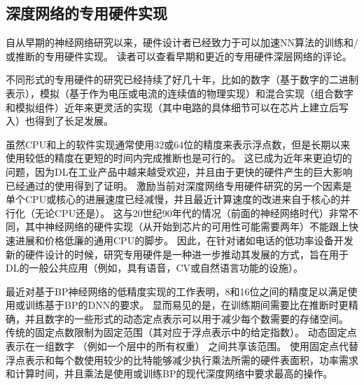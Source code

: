 \subsection{深度网络的专用硬件实现}
\label{sec:specialized_hardware_implementations_of_deep_networks}

自从早期的神经网络研究以来，硬件设计者已经致力于可以加速\gls{NN}算法的训练和/或推断的专用硬件实现。
读者可以查看早期和更近的专用硬件深层网络的评论\citep{Lindsey+Lindblad-1994,Beiu-et-al-2003,Misra+Saha-2010}。


不同形式的专用硬件\citep{Graf+Jackel-1989,Mead+Ismail-2012,Kim-et-al-2009,Pham-et-al-2012,Chen-et-al-IEEE2014,Chen-et-al-ACM2014}的研究已经持续了好几十年，比如的数字（基于数字的二进制表示），模拟\citep{Graf+Jackel-1989,Mead+Ismail-2012}（基于作为电压或电流的连续值的物理实现）和混合实现（组合数字和模拟组件）近年来更灵活的实现（其中电路的具体细节可以在芯片上建立后写入）也得到了长足发展。



虽然CPU和上的软件实现通常使用32或64位的精度来表示浮点数，但是长期以来使用较低的精度在更短的时间内完成推断也是可行的\citep{Holt-et-al-1991,Holi+Hwang-1993,Presley-et-al-1994,Simard+Graf-NIPS1994,Wawrzynek-et-al-IEEE1996,Savich-et-al-2007}。
这已成为近年来更迫切的问题，因为\gls{DL}在工业产品中越来越受欢迎，并且由于更快的硬件产生的巨大影响已经通过的使用得到了证明。
激励当前对深度网络专用硬件研究的另一个因素是单个CPU或核心的进展速度已经减慢，并且最近计算速度的改进来自于核心的并行化（无论CPU还是）。
这与20世纪90年代的情况（前面的神经网络时代）非常不同，其中神经网络的硬件实现（从开始到芯片的可用性可能需要两年）不能跟上快速进展和价格低廉的通用CPU的脚步。
因此，在针对诸如电话的低功率设备开发新的硬件设计的时候，研究专用硬件是一种进一步推动其发展的方式，旨在用于\gls{DL}的一般公共应用（例如，具有语音，\gls{CV}或自然语言功能的设施）。


最近对基于\gls{BP}神经网络的低精度实现的工作\citep{Vanhoucke-et-al-2011,Courbariaux-et-al-ICLR2015workshop,Gupta-et-al-2015}表明，8和16位之间的精度足以满足使用或训练基于\gls{BP}的\gls{DNN}的要求。
显而易见的是，在训练期间需要比在推断时更精确，并且数字的一些形式的动态定点表示可以用于减少每个数需要的存储空间。
传统的固定点数限制为固定范围（其对应于浮点表示中的给定指数）。
动态固定点表示在一组数字 （例如一个层中的所有权重） 之间共享该范围。
使用固定点代替浮点表示和每个数使用较少的比特能够减少执行乘法所需的硬件表面积，功率需求和计算时间，并且乘法是使用或训练\gls{BP}的现代深度网络中要求最高的操作。




